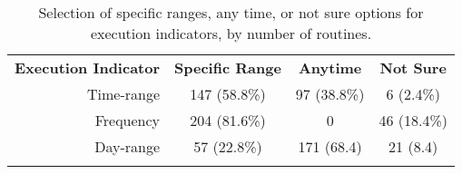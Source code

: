 \begin{table}[t]
\centering
\scriptsize
\caption{{\small Selection of specific ranges, any time, or not sure options for
execution indicators, by number of routines.}}
\label{tbl:indicators}
\begin{tabular}{r|c|c|c}
  \Xhline{2\arrayrulewidth}
 {\bf Execution Indicator}	& {\bf Specific Range}	& {\bf Anytime} & {\bf Not Sure}\\ 
  \Xhline{2\arrayrulewidth}
  Time-range		& 147 (58.8\%)		& 97 (38.8\%)	&  6 (2.4\%) \\
  Frequency		& 204 (81.6\%)		& 0		& 46 (18.4\%)	\\
  Day-range		& 57  (22.8\%)		& 171 (68.4)	& 21 (8.4) \\
  \Xhline{2\arrayrulewidth}
  \end{tabular} 
  \vspace{-2.5em}
\end{table}
